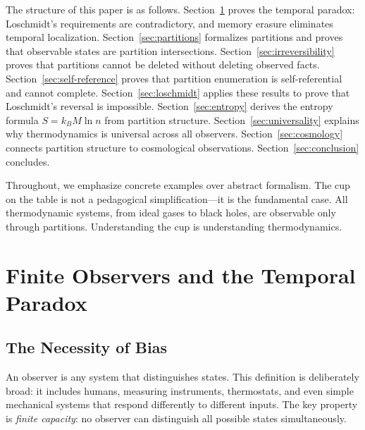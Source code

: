 \documentclass[twocolumn,10pt]{article}
\theoremstyle{definition}
\theoremstyle{remark}
\begin{document}
\vspace{0.2cm}
\noindent The structure of this paper is as follows. Section~\ref{sec:finite_observers} proves the temporal paradox: Loschmidt's requirements are contradictory, and memory erasure eliminates temporal localization. Section~\ref{sec:partitions} formalizes partitions and proves that observable states are partition intersections. Section~\ref{sec:irreversibility} proves that partitions cannot be deleted without deleting observed facts. Section~\ref{sec:self-reference} proves that partition enumeration is self-referential and cannot complete. Section~\ref{sec:loschmidt} applies these results to prove that Loschmidt's reversal is impossible. Section~\ref{sec:entropy} derives the entropy formula $S = k_B M \ln n$ from partition structure. Section~\ref{sec:universality} explains why thermodynamics is universal across all observers. Section~\ref{sec:cosmology} connects partition structure to cosmological observations. Section~\ref{sec:conclusion} concludes.

\vspace{0.2cm}
\noindent Throughout, we emphasize concrete examples over abstract formalism. The cup on the table is not a pedagogical simplification—it is the fundamental case. All thermodynamic systems, from ideal gases to black holes, are observable only through partitions. Understanding the cup is understanding thermodynamics.


\section{Finite Observers and the Temporal Paradox}
\label{sec:finite_observers}

\subsection{The Necessity of Bias}

An observer is any system that distinguishes states. This definition is deliberately broad: it includes humans, measuring instruments, thermostats, and even simple mechanical systems that respond differently to different inputs. The key property is \textit{finite capacity}: no observer can distinguish all possible states simultaneously.
\end{document}
